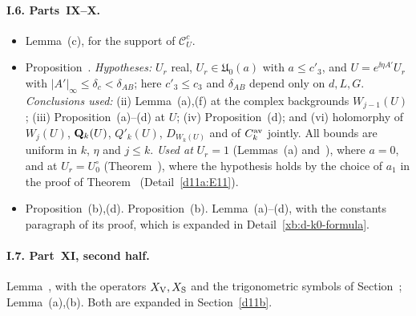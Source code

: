 \paragraph{I.6. Parts~IX--X.}
\begin{itemize}
\item Lemma~(c), for the support of $\mathcal C^c_U$.
\item Proposition~. \emph{Hypotheses:} $U_r$ real, $U_r\in\mathfrak U_0(a)$ with $a\le c'_3$, and $U=e^{\ii\eta A'}U_r$ with $|A'|_\infty\le\delta_c<\delta_{AB}$; here $c'_3\le c_3$ and $\delta_{AB}$ depend only on $d,L,G$. \emph{Conclusions used:} (ii) Lemma~(a),(f) at the complex backgrounds $W_{j-1}(U)$; (iii) Proposition~(a)--(d) at $U$; (iv) Proposition~(d); and (vi) holomorphy of $W_j(U)$, $\mathbf Q_k(U)$, $Q'_k(U)$, $D_{W_k(U)}$ and of $C^{\rm av}_k$ jointly. All bounds are uniform in $k$, $\eta$ and $j\le k$. \emph{Used at} $U_r=1$ (Lemmas~(a) and~), where $a=0$, and at $U_r=U_0^\circ$ (Theorem~), where the hypothesis holds by the choice of $a_1$ in the proof of Theorem~ (Detail~\ref{d11a:E11}).
\item Proposition~(b),(d). Proposition~(b). Lemma~(a)--(d), with the constants paragraph of its proof, which is expanded in Detail~\ref{xb:d-k0-formula}.
\end{itemize}

\paragraph{I.7. Part~XI, second half.} Lemma~, with the operators $X_{\rm V},X_{\rm S}$ and the trigonometric symbols of Section~; Lemma~(a),(b). Both are expanded in Section~\ref{d11b}.

